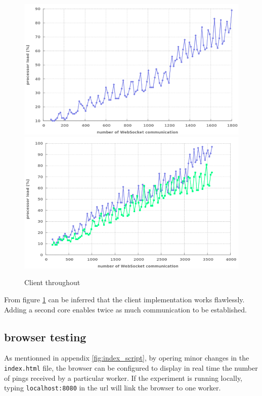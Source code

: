 \begin{figure}[H]
	\centering
		\includegraphics[width=\textwidth]{./Figures/1_client.png}
		\includegraphics[width=\textwidth]{./Figures/2_client.png}
	\caption[Client throughout]{Client throughout}
	\label{fig:1+2_client}
\end{figure}


From figure \ref{fig:1+2_client} can be inferred that the client
implementation works flawlessly. Adding a second core enables twice as much
communication  to be established.

\subsection{browser testing}

As mentionned in appendix \ref{fig:index_script}, by opering minor changes in
the \texttt{index.html} file, the browser can be configured to display in real
time the number of pings received by a particular worker. If the experiment is
running locally, typing \texttt{localhost:8080} in the url will link the
browser to one worker.\\

